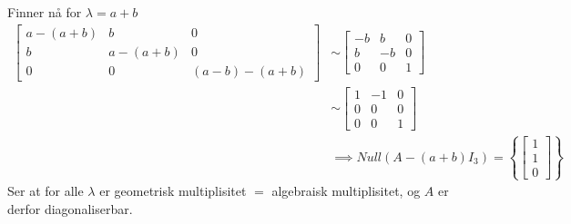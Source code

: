 \documentclass[11pt, a4paper, norsk]{NTNUoving}
\begin{document}
\begin{oppgave}
        Finner nå for $\lambda = a+b$
        \begin{align*}
            \begin{bmatrix}
                a - (a+b) & b & 0 \\
                b & a - (a + b) & 0 \\
                0 & 0 & (a-b)-(a+b)
            \end{bmatrix} &\sim \begin{bmatrix}
            -b & b & 0 \\
            b & -b & 0 \\
            0 & 0 & 1
            \end{bmatrix}
            \\
            &\sim \begin{bmatrix}
                1 & -1 & 0 \\
                0 & 0 & 0 \\
                0 & 0 & 1
            \end{bmatrix}
            \\
            &\implies Null(A - (a+b)I_3) = \left\{\begin{bmatrix}
                1 \\
                1 \\
                0
            \end{bmatrix}\right\}
        \end{align*}
        Ser at for alle $\lambda$ er geometrisk multiplisitet $=$ algebraisk multiplisitet, og $A$ er derfor diagonaliserbar.
    \end{oppgave}
\end{document}
